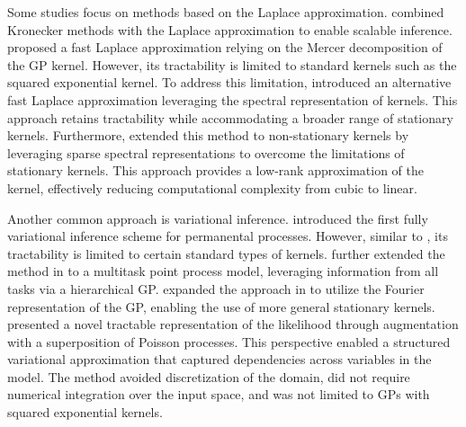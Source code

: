 \documentclass[10pt]{article} %
\begin{document}
Some studies focus on methods based on the Laplace approximation. 
\citet{flaxman2015fast} combined Kronecker methods with the Laplace approximation to enable scalable inference. 
\citet{walder2017fast} proposed a fast Laplace approximation relying on the Mercer decomposition of the GP kernel. However, its tractability is limited to standard kernels such as the squared exponential kernel. 
To address this limitation, \citet{sellier2023sparse} introduced an alternative fast Laplace approximation leveraging the spectral representation of kernels. This approach retains tractability while accommodating a broader range of stationary kernels. 
Furthermore, \citet{sunnonstationary} extended this method to non-stationary kernels by leveraging sparse spectral representations to overcome the limitations of stationary kernels. This approach provides a low-rank approximation of the kernel, effectively reducing computational complexity from cubic to linear. 

Another common approach is variational inference. 
\citet{lloyd2015variational} introduced the first fully variational inference scheme for permanental processes. However, similar to \citet{walder2017fast}, its tractability is limited to certain standard types of kernels. 
\citet{lian2015multitask} further extended the method in \citet{lloyd2015variational} to a multitask point process model, leveraging information from all tasks via a hierarchical GP. 
\citet{john2018large} expanded the approach in \citet{lloyd2015variational} to utilize the Fourier representation of the GP, enabling the use of more general stationary kernels. 
\citet{aglietti2019structured} presented a novel tractable representation of the likelihood through augmentation with a superposition of Poisson processes. This perspective enabled a structured variational approximation that captured dependencies across variables in the model. The method avoided discretization of the domain, did not require numerical integration over the input space, and was not limited to GPs with squared exponential kernels. 
\end{document}
